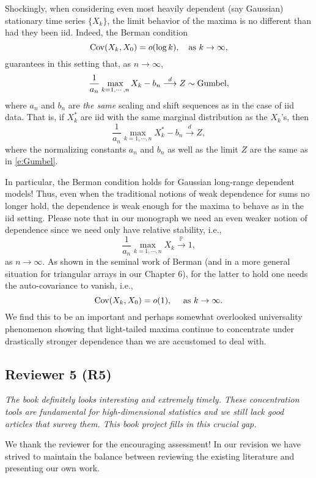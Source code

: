\documentclass[11pt]{article}
\def\P{{\mathbb P}}
\begin{document}
\begin{enumerate}
  Shockingly, when considering even most heavily dependent (say Gaussian) stationary time series $\{X_k\}$, the limit behavior of the maxima
  is no different than had they been iid.  Indeed, the Berman condition
  $$
  {\rm Cov}(X_k,X_0) = o (\log k),\ \ \mbox{ as }k\to\infty,
  $$
  guarantees in this setting that, as $n\to\infty$,
  \begin{equation}\label{e:Gumbel}
  \frac{1}{a_n} \max_{k=1,\cdots,n} X_k - b_n \stackrel{d}{\longrightarrow} Z \sim {\rm Gumbel},
  \end{equation}
  where $a_n$ and $b_n$ are {\em the same} scaling and shift sequences as in the case of iid data.  That is, if $X_k^*$ are iid with the same marginal 
  distribution as the $X_k$'s, then
  $$
  \frac{1}{a_n} \max_{k=1,\cdots,n} X_k^* - b_n \stackrel{d}{\longrightarrow} Z,
  $$
  where the normalizing constants $a_n$ and $b_n$ as well as the limit $Z$ are the same as in \eqref{e:Gumbel}.
  
  In particular, the Berman condition holds for Gaussian long-range dependent models!  Thus, even when the traditional notions of weak dependence for
  sums no longer hold, the dependence is weak enough for the maxima to behave as in the iid setting.  Please note that in our monograph we need an even weaker notion of dependence since we need only have relative stability, i.e., 
  $$
  \frac{1}{a_n} \max_{k=1,\cdots,n} X_k \stackrel{\P}{\longrightarrow} 1,
  $$
  as $n\to\infty$.  As shown in the seminal work of Berman (and in a more general situation for triangular arrays in our 
  Chapter 6), for the latter to hold one needs the auto-covariance to vanish, i.e., 
  $$
  {\rm Cov}(X_k,X_0) = o(1),\ \ \ \mbox{ as }k\to\infty.
  $$
  We find this to be an important and perhaps somewhat overlooked universality phenomenon showing that light-tailed maxima continue to 
  concentrate under drastically stronger dependence than we are accustomed to deal with.
   
   
   \end{enumerate}
   
   \subsection{Reviewer 5 (R5)}
   
  {\em The book definitely looks interesting and extremely timely. These concentration tools are fundamental for high-dimensional statistics 
  and we still lack good articles that survey them. This book project fills in this crucial gap.}
  
  
  \bigskip
\noindent   We thank the reviewer for the encouraging assessment!  In our revision we have strived to maintain the balance between reviewing the
   existing literature and presenting our own work.  
   
\end{document}
